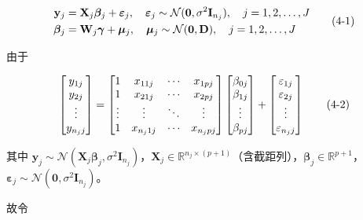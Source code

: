 \documentclass[12pt,a4paper]{ctexart}
\makeatletter
\numberwithin{figure}{section}
\numberwithin{table}{section}
\let\ltx@orig@tag\tag
\renewcommand{\tag}[1]{\refstepcounter{equation}\ltx@orig@tag{#1}}%
\makeatother
\begin{document}
\begin{equation}
\begin{aligned}
\mathbf{y}_j &= \mathbf{X}_j \boldsymbol{\beta}_j + \boldsymbol{\varepsilon}_j, \quad \boldsymbol{\varepsilon}_j \sim \mathcal{N}(\mathbf{0}, \sigma^2 \mathbf{I}_{n_j}), \quad j = 1, 2, \dots, J \\
\boldsymbol{\beta}_j &= \mathbf{W}_j \boldsymbol{\gamma} + \boldsymbol{\mu}_j, \quad \boldsymbol{\mu}_j \sim \mathcal{N}(\mathbf{0}, \mathbf{D}), \quad j = 1, 2, \dots, J
\end{aligned}
\tag{4-1}\label{eq:4-1}
\end{equation}

由于

\begin{equation}
\begin{bmatrix} y_{1j} \\ y_{2j} \\ \vdots \\ y_{n_j j} \end{bmatrix}
=
\begin{bmatrix}
1 & x_{11j} & \cdots & x_{1pj} \\
1 & x_{21j} & \cdots & x_{2pj} \\
\vdots & \vdots & \ddots & \vdots \\
1 & x_{n_j 1j} & \cdots & x_{n_j pj}
\end{bmatrix}
\begin{bmatrix} \beta_{0j} \\ \beta_{1j} \\ \vdots \\ \beta_{pj} \end{bmatrix}
+
\begin{bmatrix} \varepsilon_{1j} \\ \varepsilon_{2j} \\ \vdots \\ \varepsilon_{n_j j} \end{bmatrix}
\tag{4-2}
\end{equation}

其中 $\mathbf{y}_j \sim \mathcal{N}(\mathbf{X}_j \boldsymbol{\beta}_j, \sigma^2 \mathbf{I}_{n_j})$，$\mathbf{X}_j \in \mathbb{R}^{n_j \times (p+1)}$（含截距列），$\boldsymbol{\beta}_j \in \mathbb{R}^{p+1}$，$\boldsymbol{\varepsilon}_j \sim \mathcal{N}(\mathbf{0}, \sigma^2 \mathbf{I}_{n_j})$。

故令
\end{document}
